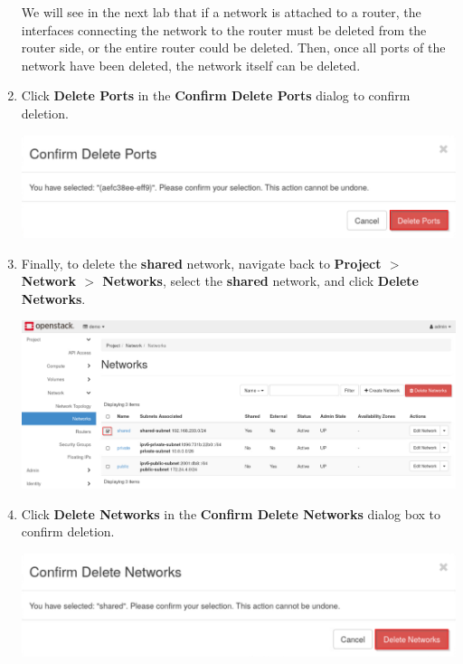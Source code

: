 \documentclass[letterpaper, 12pt]{article}
\begin{document}
\begin{enumerate}
    \begin{tipbox}
        We will see in the next lab that if a network is attached to a router, the interfaces connecting the network to the router must be deleted from the router side, or the entire router could be deleted.
        Then, once all ports of the network have been deleted, the network itself can be deleted.
    \end{tipbox}

    \item Click \textbf{Delete Ports} in the \textbf{Confirm Delete Ports} dialog to confirm deletion.

    \begin{center}
        \includegraphics[width=\linewidth]{images/part3/step4.png}
    \end{center}

    \item Finally, to delete the \textbf{shared} network, navigate back to \textbf{Project $>$ Network $>$ Networks}, select the \textbf{shared} network, and click \textbf{Delete Networks}.

    \begin{center}
        \includegraphics[width=\linewidth]{images/part3/step5.png}
    \end{center}

    \item Click \textbf{Delete Networks} in the \textbf{Confirm Delete Networks} dialog box to confirm deletion.

    \begin{center}
        \includegraphics[width=\linewidth]{images/part3/step6.png}
    \end{center}


\end{enumerate}
\end{document}
